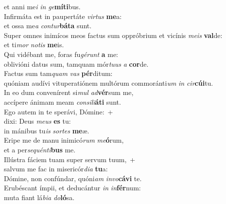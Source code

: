 \evenverse et anni me\textit{i} \textit{in} \textit{ge}\textbf{mí}\textbf{ti}bus.\\
\oddverse Infirmáta est in paupertáte \textit{vir}\textit{tus} \textbf{me}a:~\*\\
\oddverse et ossa me\textit{a} \textit{con}\textit{tur}\textbf{bá}\textbf{ta} sunt.\\
\evenverse Super omnes inimícos meos factus sum oppróbrium et vicínis \textit{me}\textit{is} \textbf{val}de:~\*\\
\evenverse et ti\textit{mor} \textit{no}\textit{tis} \textbf{me}is.\\
\oddverse Qui vidébant me, foras fu\textit{gé}\textit{runt} \textbf{a} me:~\*\\
\oddverse oblivióni datus sum, tamquam mór\textit{tu}\textit{us} \textit{a} \textbf{cor}de.\\
\evenverse Factus sum tam\textit{quam} \textit{vas} \textbf{pér}ditum:~\*\\
\evenverse quóniam audívi vituperatiónem multórum commoránti\textit{um} \textit{in} \textit{cir}\textbf{cú}\textbf{i}tu.\\
\oddverse In eo dum convenírent si\textit{mul} \textit{ad}\textbf{vér}sum me,~\*\\
\oddverse accípere ánimam meam \textit{con}\textit{si}\textit{li}\textbf{á}\textbf{ti} sunt.\\
\evenverse Ego autem in te sperávi, Dómine:~+\\
\evenverse  dixi: Deus \textit{me}\textit{us} \textbf{es} tu:~\*\\
\evenverse in mánibus tu\textit{is} \textit{sor}\textit{tes} \textbf{me}æ.\\
\oddverse Eripe me de manu inimicó\textit{rum} \textit{me}\textbf{ó}rum,~\*\\
\oddverse et a per\textit{se}\textit{quén}\textit{ti}\textbf{bus} me.\\
\evenverse Illústra fáciem tuam super servum tuum,~+\\
\evenverse  salvum me fac in misericór\textit{di}\textit{a} \textbf{tu}a:~\*\\
\evenverse Dómine, non confúndar, quóni\textit{am} \textit{in}\textit{vo}\textbf{cá}\textbf{vi} te.\\
\oddverse Erubéscant ímpii, et deducántur \textit{in} \textit{in}\textbf{fér}num:~\*\\
\oddverse muta fiant lá\textit{bi}\textit{a} \textit{do}\textbf{ló}sa.\\
